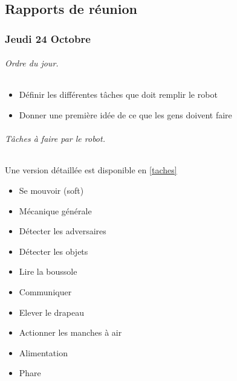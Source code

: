 \documentclass[a4paper,10pt]{report}
\begin{document}
\begin{spacing}{1.5}
\part{Rapports de réunion}
\pagestyle{fancy}
\rhead{\thepage}
\lfoot{}
\cfoot{}
\rfoot{}

\section*{Jeudi 24 Octobre}
\paragraph*{Ordre du jour.}
\begin{itemize}
\item Définir les différentes tâches que doit remplir le robot
\item Donner une première idée de ce que les gens doivent faire
\end{itemize}
\begin{multicols}{2}
\paragraph*{Tâches à faire par le robot.}
Une version détaillée est disponible en \ref{taches}
\begin{itemize}
\item Se mouvoir (soft)
\item Mécanique générale
\item Détecter les adversaires
\item Détecter les objets
\item Lire la boussole
\item Communiquer
\item Elever le drapeau
\item Actionner les manches à air
\item Alimentation
\item Phare
\end{itemize}
\columnbreak

\end{multicols}
\end{spacing}
\end{document}
